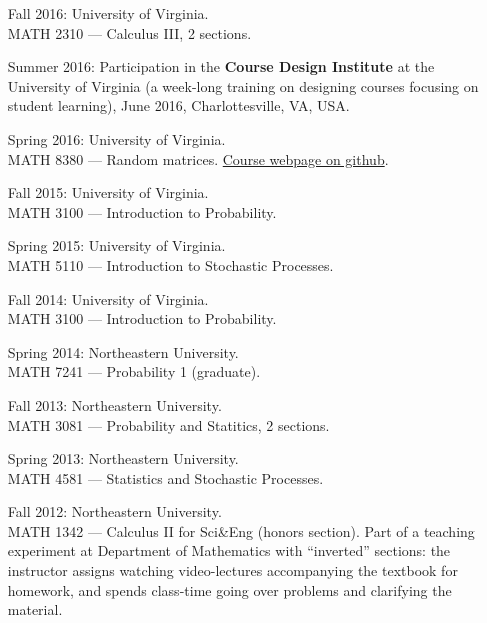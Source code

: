 \documentclass[letterpaper,11pt]{article}
\begin{document}
\begin{itemize}
	\item
	      [Fall 2016:]
	      University of Virginia. \\ MATH 2310 --- Calculus III, 2
	      sections.

	\item
	      [Summer 2016:] Participation in the \textbf{Course Design
		      Institute} at
	      the University of Virginia (a week-long training on designing
	      courses focusing on student learning), June 2016, Charlottesville, VA, USA.

	\item
	      [Spring 2016:]
	      University of Virginia. \\ MATH 8380 --- Random matrices.
		  \href{https://github.com/lenis2000/RMT_Spring_2016}{Course webpage on github}.

	\item
	      [Fall 2015:]
	      University of Virginia. \\ MATH 3100 --- Introduction to
	      Probability.

	\item
	      [Spring 2015:]
	      University of Virginia. \\ MATH 5110 --- Introduction to
	      Stochastic Processes.

	\item
	      [Fall 2014:]
	      University of Virginia. \\ MATH 3100 --- Introduction to
	      Probability.

	\item
	      [Spring 2014:]
	      Northeastern University. \\ MATH 7241 --- Probability 1
	      (graduate).

	\item
	      [Fall 2013:]
	      Northeastern University. \\ MATH 3081 --- Probability and
	      Statitics, 2 sections.
	\item
	      [Spring 2013:]
	      Northeastern University. \\ MATH 4581 --- Statistics and
	      Stochastic Processes.
	\item
	      [Fall 2012:]
	      Northeastern University. \\ MATH 1342 --- Calculus II for
	      Sci\&Eng (honors section). Part of a teaching experiment at Department of
	      Mathematics with ``inverted'' sections: the instructor assigns watching
	      video-lectures accompanying the textbook for homework, and spends class-time
	      going over problems and clarifying the material.


\end{itemize}
\end{document}

